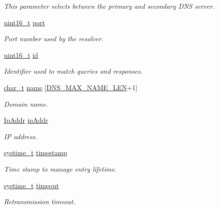 \begin{DoxyCompactItemize}
\begin{DoxyCompactList}\small\item\em This parameter selects between the primary and secondary D\+NS server. \end{DoxyCompactList}\item 
\hyperlink{stdint_8h_a273cf69d639a59973b6019625df33e30}{uint16\+\_\+t} \hyperlink{structDnsCacheEntry_a694ec8e23fd08f447e85244478ace829}{port}
\begin{DoxyCompactList}\small\item\em Port number used by the resolver. \end{DoxyCompactList}\item 
\hyperlink{stdint_8h_a273cf69d639a59973b6019625df33e30}{uint16\+\_\+t} \hyperlink{structDnsCacheEntry_ab32547b4942b2db0f0c0bcb41458856d}{id}
\begin{DoxyCompactList}\small\item\em Identifier used to match queries and responses. \end{DoxyCompactList}\item 
\hyperlink{compiler__port_8h_a40bb5262bf908c328fbcfbe5d29d0201}{char\+\_\+t} \hyperlink{structDnsCacheEntry_a81b2ed3b8465dd82a249f7141865dae6}{name} \mbox{[}\hyperlink{dns__cache_8h_a7e65f1dc9786665c3a432eabe2972bc4}{D\+N\+S\+\_\+\+M\+A\+X\+\_\+\+N\+A\+M\+E\+\_\+\+L\+EN}+1\mbox{]}
\begin{DoxyCompactList}\small\item\em Domain name. \end{DoxyCompactList}\item 
\hyperlink{structIpAddr}{Ip\+Addr} \hyperlink{structDnsCacheEntry_aad3958e8dcdeb2eea1a99089b2a8f5b1}{ip\+Addr}
\begin{DoxyCompactList}\small\item\em IP address. \end{DoxyCompactList}\item 
\hyperlink{compiler__port_8h_ae3e32a98d431a02106616da3071832dd}{systime\+\_\+t} \hyperlink{structDnsCacheEntry_ae149514d2ade99ae033ecedd03a5daf0}{timestamp}
\begin{DoxyCompactList}\small\item\em Time stamp to manage entry lifetime. \end{DoxyCompactList}\item 
\hyperlink{compiler__port_8h_ae3e32a98d431a02106616da3071832dd}{systime\+\_\+t} \hyperlink{structDnsCacheEntry_a5bf3981653624c3e313f7f364b526cdb}{timeout}
\begin{DoxyCompactList}\small\item\em Retransmission timeout. \end{DoxyCompactList}\item 

\end{DoxyCompactItemize}
